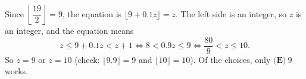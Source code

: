 Since $\left\lfloor\dfrac{19}{2}\right\rfloor=9$, the equation is $\lfloor9+0.1z\rfloor=z$. The left side is an integer, so $z$ is an integer, and the equation means
\[z\le9+0.1z<z+1\iff 8<0.9z\le9\iff\dfrac{80}{9}<z\le10.\]
So $z=9$ or $z=10$ (check: $\lfloor9.9\rfloor=9$ and $\lfloor10\rfloor=10$). Of the choices, only $\boxed{\textbf{(E)}\ 9}$ works.
